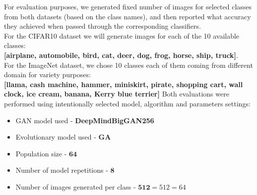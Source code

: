 \documentclass[12pt,a4paper,openany]{book}
\begin{document}
\noindent For evaluation purposes, we generated fixed number of images for selected classes from both datasets (based on the class names), and then reported what accuracy they achieved when passed through the corresponding classifiers. \\
\noindent For the CIFAR10 dataset we will generate images for each of the 10 available classes: \\
\noindent \textbf{[airplane, automobile, bird, cat, deer, dog, frog, horse, ship, truck]}.\\
For the ImageNet dataset, we chose 10 classes each of them coming from different domain for variety purposes: \\
\noindent \textbf{[llama,  cash machine,  hammer,  miniskirt,  pirate,  shopping cart,  wall clock,  ice cream,  banana, Kerry blue terrier]} 
\newline
Both evaluations were performed using intentionally selected model, algorithm and parameters settings:
\begin{itemize}
\item GAN model used - \textbf{DeepMindBigGAN256}
\item Evolutionary model used - \textbf{GA}
\item Population size - $\bm{64}$
\item Number of model repetitions - $\bm{8}$
\item Number of images generated per class - $\bm{512} = 512 = 64$
\end{itemize}
\end{document}
